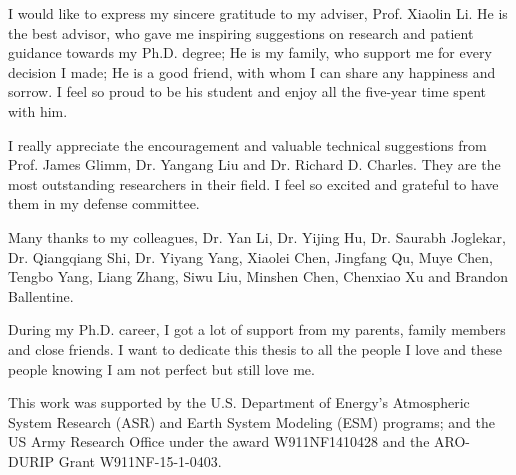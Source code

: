 \begin{spacing}{1.4}
I would like to express my sincere gratitude to my adviser, Prof. 
Xiaolin Li. He is the best advisor, who gave me inspiring suggestions
on research and patient guidance towards my Ph.D. degree; He is my family, who 
support me for every decision I made; He is a good friend, with whom I can share
any happiness and sorrow. I feel so proud to be his student and enjoy all the
five-year time spent with him.

I really appreciate the encouragement and valuable technical suggestions from
Prof. James Glimm, Dr. Yangang Liu and Dr. Richard D. Charles.
They are the most outstanding researchers in their field. I feel so
excited and grateful to have them in my defense committee.  

Many thanks to my colleagues, Dr. Yan Li, Dr. Yijing Hu, Dr.  Saurabh Joglekar, Dr. Qiangqiang Shi, 
Dr. Yiyang Yang, Xiaolei Chen, Jingfang Qu, Muye Chen, 
Tengbo Yang, Liang Zhang, Siwu Liu, Minshen Chen, Chenxiao Xu and Brandon Ballentine.

During my Ph.D. career, I got a lot of support from my parents, family 
members and close friends. I want to dedicate this thesis to all the people
I love and these people knowing I am not perfect but still love me.

This work was supported by the U.S. Department of Energy's Atmospheric System Research (ASR) and Earth System Modeling (ESM) programs;
and the US Army Research Office under the award W911NF1410428 and the ARO-DURIP Grant W911NF-15-1-0403.

\end{spacing}
